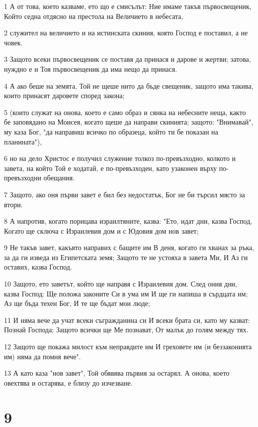 \par 1 А от това, което казваме, ето що е смисълът: Ние имаме такъв първосвещеник, Който седна отдясно на престола на Величието в небесата,
\par 2 служител на величието и на истинската скиния, която Господ е поставил, а не човек.
\par 3 Защото всеки първосвещеник се поставя да принася и дарове и жертви; затова, нуждно е и Тоя първосвещеник да има нещо да принася.
\par 4 А ако беше на земята, Той не щеше нито да бъде свещеник, защото има такива, които принасят даровете според закона;
\par 5 (които служат на онова, което е само образ и сянка на небесните неща, както бе заповядано на Моисея, когато щеше да направи скинията; защото: "Внимавай", му каза Бог, "да направиш всичко по образеца, който ти бе показан на планината"),
\par 6 но на дело Христос е получил служение толкоз по-превъзходно, колкото и завета, на който Той е ходатай, е по-превъзходен, като узаконен върху по-превъзходни обещания.
\par 7 Защото, ако оня първи завет е бил без недостатък, Бог не би търсил място за втори.
\par 8 А напротив, когато порицава израилтяните, казва: "Ето, идат дни, казва Господ, Когато ще сключа с Израилевия дом и с Юдовия дом нов завет;
\par 9 Не такъв завет, какъвто направих с бащите им В деня, когато ги хванах за ръка, за да ги изведа из Египетската земя; Защото те не устояха в завета Ми, И Аз ги оставих, казва Господ.
\par 10 Защото, ето заветът, който ще направя с Израилевия дом. След ония дни, казва Господ: Ще положа законите Си в ума им И ще ги напиша в сърдцата им; Аз ще бъда техен Бог, И те ще бъдат мои люде;
\par 11 И няма вече да учат всеки съгражданина си И всеки брата си, като му казват: Познай Господа; Защото всички ще Ме познават, От малък до голям между тях.
\par 12 Защото ще покажа милост към неправдите им И греховете им (и беззаконията им) няма да помня вече".
\par 13 А като каза "нов завет", Той обявява първия за остарял. А онова, което овехтява и остарява, е близу до изчезване.

\chapter{9}

